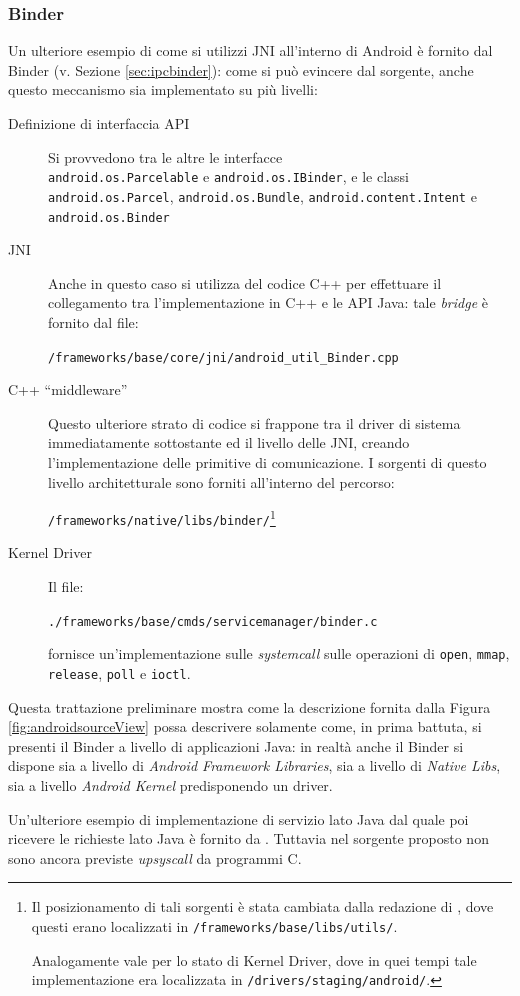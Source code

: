 \subsubsection{Binder}
Un ulteriore esempio di come si utilizzi JNI all'interno di Android è
fornito dal Binder (v. Sezione \vref{sec:ipcbinder}): come si può evincere 
dal sorgente,  anche questo meccanismo
sia implementato su più livelli:
\begin{description}
\item[Definizione di interfaccia API] Si provvedono tra le altre le interfacce\\
	\texttt{\small android.os.Parcelable} e \texttt{\small android.os.IBinder},
	e le classi \texttt{\small android.os.Parcel}, \texttt{\small android.os.Bundle},
	\texttt{\small android.content.Intent} e \texttt{\small android.os.Binder}
\item[JNI] Anche in questo caso si utilizza del codice C++ per effettuare 
	il collegamento tra l'implementazione in C++ e le API Java: tale \textit{bridge}
	è fornito dal file:
	\begin{center}
	\texttt{\small \AOSP/frameworks/base/core/jni/android\_util\_Binder.cpp}
	\end{center}
\item[C++ ``middleware''] Questo ulteriore strato di codice si frappone
	tra il driver di sistema immediatamente sottostante ed il livello delle
	JNI, creando l'implementazione delle primitive di comunicazione. I 
	sorgenti di questo livello architetturale sono forniti all'interno
	del percorso:
	\begin{center}
	\texttt{\small \AOSP/frameworks/native/libs/binder/}\footnote{Il posizionamento
	di tali sorgenti è stata cambiata dalla redazione di  \parencite{tesi:binder},
	dove questi erano localizzati in  \texttt{\small \AOSP/frameworks/base/libs/utils/}.

	Analogamente vale per lo stato di Kernel Driver, dove in quei tempi tale
	implementazione era localizzata in \texttt{\small \AOSP/drivers/staging/android/}.
	}
	\end{center}
\item[Kernel Driver] Il file:
	\begin{center}
	\texttt{\small ./frameworks/base/cmds/servicemanager/binder.c}
	\end{center}
	fornisce un'implementazione sulle \textit{systemcall} sulle operazioni di
	\texttt{\small open}, \texttt{\small mmap}, \texttt{\small release}, \texttt{\small poll}
	e \texttt{\small ioctl}.
\end{description}

Questa trattazione preliminare mostra come la descrizione fornita dalla Figura \vref{fig:androidsourceView}
possa descrivere solamente come, in prima battuta, si presenti il Binder a 
livello di applicazioni Java: in realtà anche il Binder si dispone sia a livello
di \textit{Android Framework Libraries}, sia a livello di \textit{Native Libs}, sia
a livello \textit{Android Kernel} predisponendo un driver.
\medskip

Un'ulteriore esempio di implementazione di servizio lato Java dal quale poi
ricevere le richieste lato Java è fornito da \parencite{site:marakRemixing}.
Tuttavia nel sorgente proposto non sono ancora previste \textit{upsyscall} 
da programmi C.
